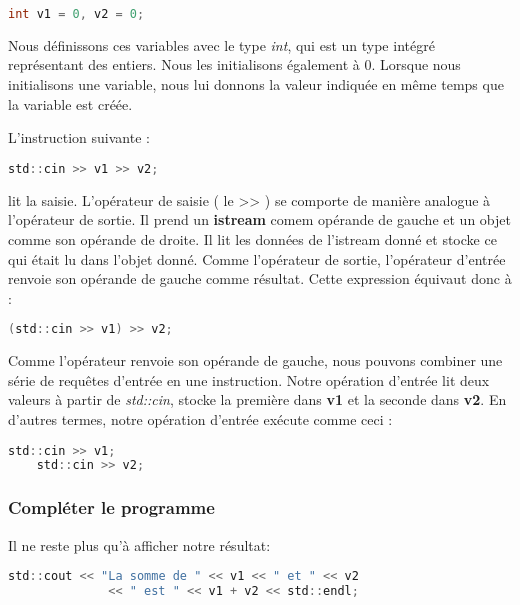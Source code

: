 \medbreak
\begin{lstlisting}[language=C]
	int v1 = 0, v2 = 0;
\end{lstlisting}
\medbreak

Nous définissons ces variables avec le type \textit{int}, qui est un type intégré représentant des entiers. Nous les initialisons également à 0. Lorsque nous initialisons une variable, nous lui donnons la valeur indiquée en même temps que la variable est créée.

L'instruction suivante :

\medbreak
\begin{lstlisting}[language=C]
	std::cin >> v1 >> v2;
\end{lstlisting}
\medbreak 

lit la saisie. L'opérateur de saisie ( le >> ) se comporte de manière analogue à l'opérateur de sortie. Il prend un \textbf{istream} comem opérande de gauche et un objet comme son opérande de droite. Il lit les données de l'istream donné et stocke ce qui était lu dans l'objet donné. Comme l'opérateur de sortie, l'opérateur d'entrée renvoie son opérande de gauche comme résultat. Cette expression équivaut donc à :

\medbreak
\begin{lstlisting}[language=C]
	(std::cin >> v1) >> v2;
\end{lstlisting}
\medbreak

Comme l'opérateur renvoie son opérande de gauche, nous pouvons combiner une série de requêtes d'entrée en une instruction. Notre opération d'entrée lit deux valeurs à partir de \textit{std::cin}, stocke la première dans \textbf{v1} et la seconde dans \textbf{v2}. En d'autres termes, notre opération d'entrée exécute comme ceci :

\medbreak
\begin{lstlisting}[language=C]
	std::cin >> v1;
	std::cin >> v2;
\end{lstlisting}
\medbreak 

\subsubsection{Compléter le programme}
Il ne reste plus qu'à afficher notre résultat:

\medbreak
\begin{lstlisting}[language=C]
	std::cout << "La somme de " << v1 << " et " << v2
			  << " est " << v1 + v2 << std::endl;
\end{lstlisting}
\medbreak

